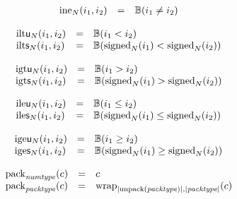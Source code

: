 $$
\begin{array}[t]{@{}lcl@{}l@{}}
{{\mathrm{ine}}}_{N}(i_1, i_2) & = & \mathbb{B}(i_1 \neq i_2) \\
\end{array}
$$

$$
\begin{array}[t]{@{}lcl@{}l@{}}
{{\mathrm{ilt}}}{\mathsf{u}}{{}_{N}(i_1, i_2)} & = & \mathbb{B}(i_1 < i_2) \\
{{\mathrm{ilt}}}{\mathsf{s}}{{}_{N}(i_1, i_2)} & = & \mathbb{B}({{\mathrm{signed}}}_{N}(i_1) < {{\mathrm{signed}}}_{N}(i_2)) \\
\end{array}
$$

$$
\begin{array}[t]{@{}lcl@{}l@{}}
{{\mathrm{igt}}}{\mathsf{u}}{{}_{N}(i_1, i_2)} & = & \mathbb{B}(i_1 > i_2) \\
{{\mathrm{igt}}}{\mathsf{s}}{{}_{N}(i_1, i_2)} & = & \mathbb{B}({{\mathrm{signed}}}_{N}(i_1) > {{\mathrm{signed}}}_{N}(i_2)) \\
\end{array}
$$

$$
\begin{array}[t]{@{}lcl@{}l@{}}
{{\mathrm{ile}}}{\mathsf{u}}{{}_{N}(i_1, i_2)} & = & \mathbb{B}(i_1 \leq i_2) \\
{{\mathrm{ile}}}{\mathsf{s}}{{}_{N}(i_1, i_2)} & = & \mathbb{B}({{\mathrm{signed}}}_{N}(i_1) \leq {{\mathrm{signed}}}_{N}(i_2)) \\
\end{array}
$$

$$
\begin{array}[t]{@{}lcl@{}l@{}}
{{\mathrm{ige}}}{\mathsf{u}}{{}_{N}(i_1, i_2)} & = & \mathbb{B}(i_1 \geq i_2) \\
{{\mathrm{ige}}}{\mathsf{s}}{{}_{N}(i_1, i_2)} & = & \mathbb{B}({{\mathrm{signed}}}_{N}(i_1) \geq {{\mathrm{signed}}}_{N}(i_2)) \\
\end{array}
$$

\vspace{1ex}

\vspace{1ex}

\vspace{1ex}

\vspace{1ex}

\vspace{1ex}

$$
\begin{array}[t]{@{}lcl@{}l@{}}
{{\mathrm{pack}}}_{{\mathit{numtype}}}(c) & = & c \\
{{\mathrm{pack}}}_{{\mathit{packtype}}}(c) & = & {{\mathrm{wrap}}}_{{|{\mathrm{unpack}}({\mathit{packtype}})|}, {|{\mathit{packtype}}|}}(c) \\
\end{array}
$$


